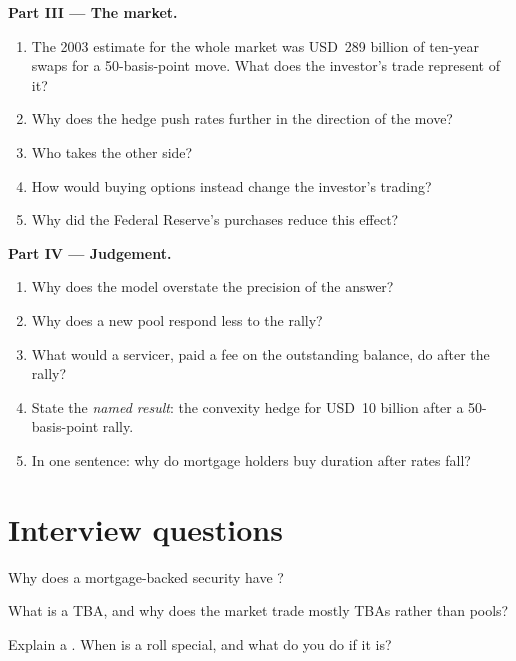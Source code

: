 \begin{problem}
\medskip\noindent\textbf{Part III --- The market.}
\begin{enumerate}[resume]
\item The 2003 estimate for the whole market was USD~289 billion of ten-year
swaps for a 50-basis-point move. What does the investor's trade represent of it?
\item Why does the hedge push rates further in the direction of the move?
\item Who takes the other side?
\item How would buying options instead change the investor's trading?
\item Why did the Federal Reserve's purchases reduce this effect?
\end{enumerate}

\medskip\noindent\textbf{Part IV --- Judgement.}
\begin{enumerate}[resume]
\item Why does the model overstate the precision of the answer?
\item Why does a new pool respond less to the rally?
\item What would a servicer, paid a fee on the outstanding balance, do after the rally?
\item State the \emph{named result}: the convexity hedge for USD~10 billion
after a 50-basis-point rally.
\item In one sentence: why do mortgage holders buy duration after rates fall?
\end{enumerate}
\end{problem}

\section{Interview questions}

\begin{interviewq}\label{iq:m2:mortgages-and-agencies:1}
Why does a mortgage-backed security have ?
\end{interviewq}

\begin{interviewq}\label{iq:m2:mortgages-and-agencies:2}
What is a TBA, and why does the market trade mostly TBAs rather than pools?
\end{interviewq}

\begin{interviewq}\label{iq:m2:mortgages-and-agencies:3}
Explain a . When is a roll special, and what do you do if it is?
\end{interviewq}

